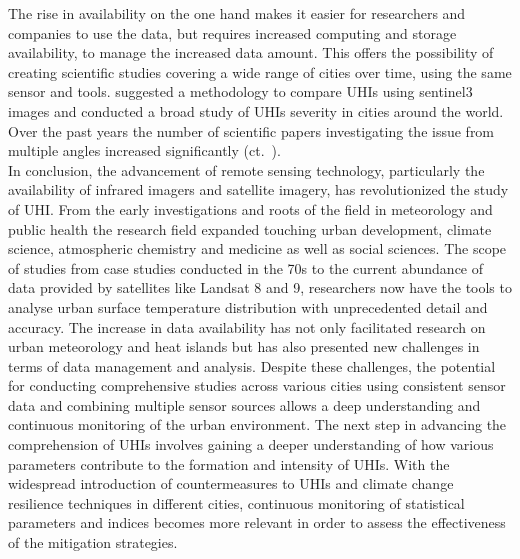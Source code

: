 \documentclass[12pt,a4paper, english]{article}
\begin{document}
  The rise in availability on the one hand makes it easier for researchers and companies to use the data, but requires increased computing and storage availability, to manage the increased data amount.
  This offers the possibility of creating scientific studies covering a wide range of cities over time, using the same sensor and tools. 
  \autocite{Sobrino2020} suggested a methodology to compare \glspl{UHI} using \gls{sentinel3} images and conducted a broad study of \glspl{UHI} severity in cities around the world. 
  Over the past years the number of scientific papers investigating the issue from multiple angles increased significantly (ct.~\autocite[P. 3]{Piracha2022b}).\\
  In conclusion, the advancement of remote sensing technology, particularly the availability of infrared imagers and satellite imagery, has revolutionized the study of \gls{UHI}. 
  From the early investigations and roots of the field in meteorology and public health the research field expanded touching urban development, climate science, atmospheric chemistry and medicine as well as social sciences.
  The scope of studies from case studies conducted in the 70s to the current abundance of data provided by satellites like Landsat 8 and 9, researchers now have the tools to analyse urban surface temperature distribution with unprecedented detail and accuracy.
  The increase in data availability has not only facilitated research on urban meteorology and heat islands but has also presented new challenges in terms of data management and analysis.
  Despite these challenges, the potential for conducting comprehensive studies across various cities using consistent sensor data and combining multiple sensor sources allows a deep understanding and continuous monitoring of the urban environment.
  The next step in advancing the comprehension of \glspl{UHI} involves gaining a deeper understanding of how various parameters contribute to the formation and intensity of \glspl{UHI}.
  With the widespread introduction of countermeasures to \glspl{UHI} and climate change resilience techniques in different cities, continuous monitoring of statistical parameters and indices becomes more relevant in order to assess the effectiveness of the mitigation strategies. 
\end{document}
